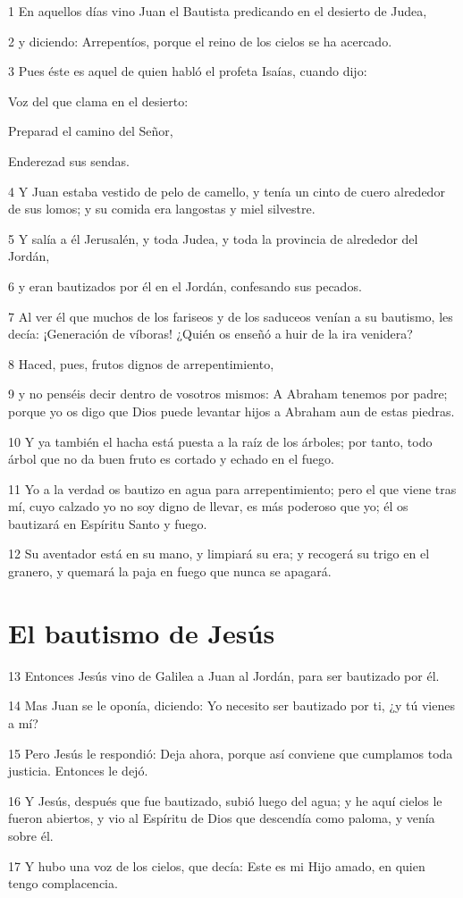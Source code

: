 \par 1 En aquellos días vino Juan el Bautista predicando en el desierto de Judea,
\par 2 y diciendo: Arrepentíos, porque el reino de los cielos se ha acercado.
\par 3 Pues éste es aquel de quien habló el profeta Isaías, cuando dijo:
\par Voz del que clama en el desierto:
\par Preparad el camino del Señor,
\par Enderezad sus sendas.
\par 4 Y Juan estaba vestido de pelo de camello, y tenía un cinto de cuero alrededor de sus lomos; y su comida era langostas y miel silvestre.
\par 5 Y salía a él Jerusalén, y toda Judea, y toda la provincia de alrededor del Jordán,
\par 6 y eran bautizados por él en el Jordán, confesando sus pecados.
\par 7 Al ver él que muchos de los fariseos y de los saduceos venían a su bautismo, les decía: ¡Generación de víboras! ¿Quién os enseñó a huir de la ira venidera?
\par 8 Haced, pues, frutos dignos de arrepentimiento,
\par 9 y no penséis decir dentro de vosotros mismos: A Abraham tenemos por padre; porque yo os digo que Dios puede levantar hijos a Abraham aun de estas piedras.
\par 10 Y ya también el hacha está puesta a la raíz de los árboles; por tanto, todo árbol que no da buen fruto es cortado y echado en el fuego.
\par 11 Yo a la verdad os bautizo en agua para arrepentimiento; pero el que viene tras mí, cuyo calzado yo no soy digno de llevar, es más poderoso que yo; él os bautizará en Espíritu Santo y fuego.
\par 12 Su aventador está en su mano, y limpiará su era; y recogerá su trigo en el granero, y quemará la paja en fuego que nunca se apagará.

\section*{El bautismo de Jesús}

\par 13 Entonces Jesús vino de Galilea a Juan al Jordán, para ser bautizado por él.
\par 14 Mas Juan se le oponía, diciendo: Yo necesito ser bautizado por ti, ¿y tú vienes a mí?
\par 15 Pero Jesús le respondió: Deja ahora, porque así conviene que cumplamos toda justicia. Entonces le dejó.
\par 16 Y Jesús, después que fue bautizado, subió luego del agua; y he aquí cielos le fueron abiertos, y vio al Espíritu de Dios que descendía como paloma, y venía sobre él.
\par 17 Y hubo una voz de los cielos, que decía: Este es mi Hijo amado, en quien tengo complacencia.

